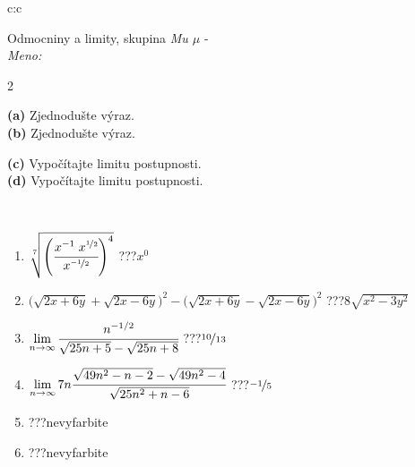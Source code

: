\documentclass[10pt]{report}
\begin{document}
\begin{tabular}{c:c}
\begin{minipage}[c][104.5mm][t]{0.5\linewidth}
\begin{center}
\vspace{7mm}
{\huge Odmocniny a limity, skupina \textit{Mu $\mu$} -}\\[5mm]
\textit{Meno:}\phantom{xxxxxxxxxxxxxxxxxxxxxxxxxxxxxxxxxxxxxxxxxxxxxxxxxxxxxxxxxxxxxxxxx}\\[5mm]
\begin{minipage}{0.95\linewidth}
\begin{center}
{\small \begin{multicols}{2} \raggedright
\textbf{(a)} Zjednodušte výraz. \\[1mm]
\textbf{(b)} Zjednodušte výraz. \par \columnbreak
\textbf{(c)} Vypočítajte limitu postupnosti. \\[1mm]
\textbf{(d)} Vypočítajte limitu postupnosti.
\end{multicols}
}
\end{center}
\end{minipage}
\\[4mm]
\begin{minipage}{0.79\linewidth}
\begin{center}
\begin{varwidth}{\linewidth}
\begin{enumerate}
\small
\item $\sqrt[7]{\left(\cfrac{x^{-1}\;x^{\nicefrac{1}{2}}}{x^{\nicefrac{-1}{2}}}\right)^{4}}$\quad \dotfill\; ???\;\dotfill \quad $x^{0}$
\item {\footnotesize{\scriptsize$\big(\sqrt{2x+6y}+\sqrt{2x-6y}\big)^2-\big(\sqrt{2x+6y}-\sqrt{2x-6y}\big)^2$}\quad \dotfill\; ???\;\dotfill \quad $8\sqrt{x^2-3y^2}$}
\item $\lim\limits_{n\to\infty}\cfrac{n^{-1/2}}{\sqrt{25n+5}-\sqrt{25n+8}}$\quad \dotfill\; ???\;\dotfill \quad $\nicefrac{10}{13}$
\item $\lim\limits_{n\to\infty}7n\cfrac{\sqrt{49n^2-n-2}-\sqrt{49n^2-4}}{\sqrt{25n^2+n-6}}$\quad \dotfill\; ???\;\dotfill \quad $\nicefrac{-1}{5}$
\item \quad \dotfill\; ???\;\dotfill \quad nevyfarbite
\item \quad \dotfill\; ???\;\dotfill \quad nevyfarbite
\end{enumerate}
\end{varwidth}
\end{center}

\end{minipage}
\end{center}
\end{minipage}
\end{tabular}
\end{document}
